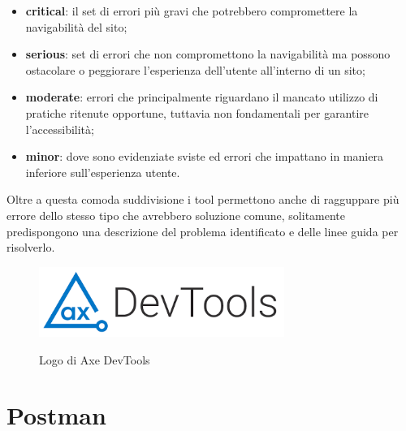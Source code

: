 \begin{itemize}
    \item \textbf{critical}: il set di errori più gravi che potrebbero compromettere la navigabilità del sito;
    \item \textbf{serious}: set di errori che non compromettono la navigabilità ma possono ostacolare o peggiorare l'esperienza dell'utente all'interno di un sito;
    \item \textbf{moderate}: errori che principalmente riguardano il mancato utilizzo di pratiche ritenute opportune, tuttavia non fondamentali per garantire l'accessibilità;
    \item \textbf{minor}:  dove sono evidenziate sviste ed errori che impattano in maniera inferiore sull'esperienza utente.
\end{itemize}

Oltre a questa comoda suddivisione i tool permettono anche di ragguppare più errore dello stesso tipo che avrebbero soluzione comune, solitamente predispongono una descrizione del problema identificato e delle linee guida per risolverlo.

\begin{figure}[H]
    \caption{Logo di Axe DevTools}
    \centering
    \includegraphics[width=80mm]{img/logos/axeDevtools_logo.png}
    \label{fig:axeDevtools}
\end{figure}

\section{Postman}


